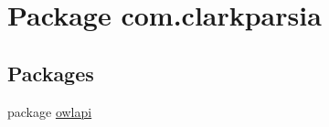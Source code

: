 \hypertarget{namespacecom_1_1clarkparsia}{\section{Package com.\-clarkparsia}
\label{namespacecom_1_1clarkparsia}
}
\subsection*{Packages}
\begin{DoxyCompactItemize}
\item 
package \hyperlink{namespacecom_1_1clarkparsia_1_1owlapi}{owlapi}
\end{DoxyCompactItemize}
